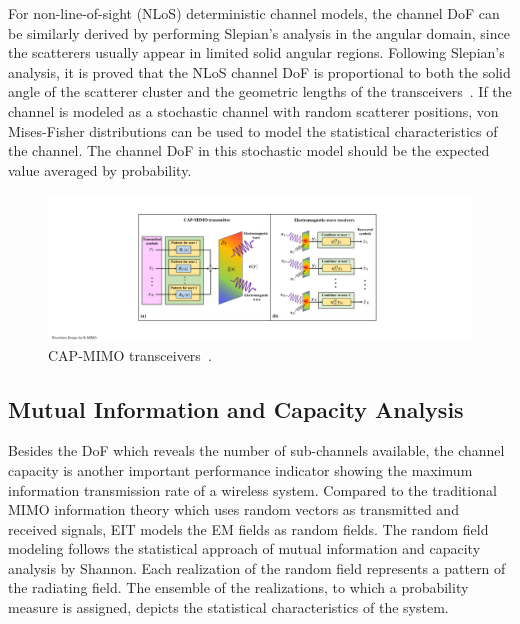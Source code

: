 \documentclass[journal,twocolumn]{IEEEtran}
\begin{document}
For non-line-of-sight (NLoS) deterministic channel models, the channel DoF can be similarly derived by performing Slepian's analysis in the angular domain, since the scatterers usually appear in limited solid angular regions. 
Following Slepian's analysis, it is proved that the NLoS channel DoF is proportional to both the solid angle of the scatterer cluster and the geometric lengths of the transceivers~\cite{poon2005degrees}.   
If the channel is modeled as a stochastic channel with random scatterer positions, von Mises-Fisher distributions can be used to model the statistical characteristics of the channel. 
The channel DoF in this stochastic model should be the expected value averaged by probability.
\begin{figure}[ht]
	\centering 
	\includegraphics[width=0.85\linewidth]{figures/CAPMIMO.pdf} 
	\caption{CAP-MIMO transceivers~\cite{zhang2022pdma}.  }
	\label{fig:CAPMIMO}
\end{figure}

\subsection{Mutual Information and Capacity Analysis}
Besides the DoF which reveals the number of sub-channels available, the channel capacity is another important performance indicator showing the maximum information transmission rate of a wireless system. 
Compared to the traditional MIMO information theory which uses random vectors as transmitted and received signals, EIT models the EM fields as random fields. 
The random field modeling follows the statistical approach of mutual information and capacity analysis by Shannon. 
Each realization of the random field represents a pattern of the radiating field. The ensemble of the realizations, to which a probability measure is assigned, depicts the statistical characteristics of the system. 
\end{document}
